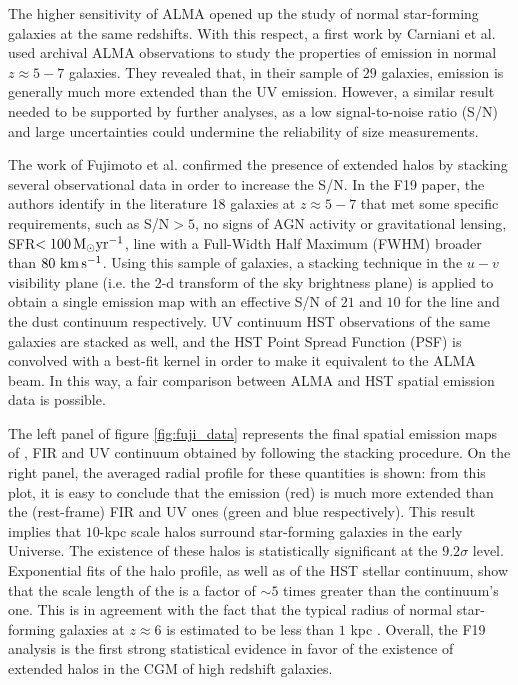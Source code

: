 The higher sensitivity of ALMA opened up the study of normal star-forming galaxies at the same redshifts. With this respect, a first work by Carniani et al. \citep{carniani2018} used archival ALMA observations to study the properties of \CII emission in normal $z\approx 5-7$ galaxies. They revealed that, in their sample of $29$ galaxies, \CII emission is generally much more extended than the UV emission. However, a similar result needed to be supported by further analyses, as a low signal-to-noise ratio (S/N) and large uncertainties could undermine the reliability of size measurements. 

The work of Fujimoto et al. \citep[][hereafter F19]{Fujimoto19} confirmed the presence of extended \CII halos by stacking several observational data in order to increase the S/N. In the F19 paper, the authors identify in the literature \citep[e.g.,][]{capak2015, maiolino2015, willott2015, pentericci2016, carniani2018} 18 galaxies at $z \approx 5-7$ that met some specific requirements, such as \CII S/N$>5$, no signs of AGN activity or gravitational lensing, SFR$<100\,{\rm M}_{\odot}\mathrm{yr}^{-1}$, \CII line with a Full-Width Half Maximum (FWHM) broader than $80\,\,\rm km\,s^{-1}$. Using this sample of galaxies, a stacking technique in the $u-v$ visibility plane (i.e. the 2-d transform of the sky brightness plane) is applied to obtain a single emission map with an effective S/N of $21$ and $10$ for the \CII line and the dust continuum respectively. UV continuum HST observations of the same galaxies are stacked as well, and the HST Point Spread Function (PSF) is convolved with a best-fit kernel in order to make it equivalent to the ALMA beam. In this way, a fair comparison between ALMA and HST spatial emission data is possible. 

The left panel of figure \ref{fig:fuji_data} represents the final spatial emission maps of \CII, FIR and UV continuum obtained by following the stacking procedure. On the right panel, the averaged radial profile for these quantities is shown: from this plot, it is easy to conclude that the \CII emission (red) is much more extended than the (rest-frame) FIR and UV ones (green and blue respectively). This result implies that $10$-kpc scale \CII halos surround star-forming galaxies in the early Universe. The existence of these halos is statistically significant at the $9.2\sigma$ level. Exponential fits of the halo profile, as well as of the HST stellar continuum, show that the scale length of the \CII is a factor of $\sim5$ times greater than the continuum's one. This is in agreement with the fact that the typical radius of normal star-forming galaxies at $z\approx 6$ is estimated to be less than $1$ kpc \citep{Shibuya:2015qfa}. Overall, the F19 analysis is the first strong statistical evidence in favor of the existence of extended \CII halos in the CGM of high redshift galaxies.




